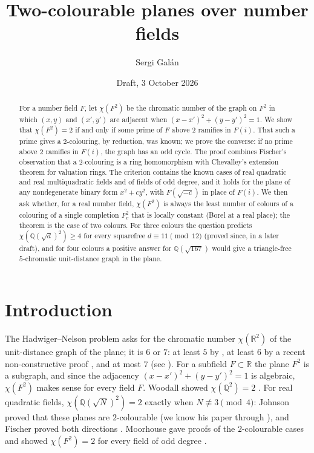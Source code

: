 \documentclass[11pt,a4paper]{amsart}
\title{Two-colourable planes over number fields}
\author{Sergi Gal\'an}
\date{Draft, 3 October 2026}
\theoremstyle{definition}
\newcommand{\Q}{\mathbb{Q}}
\newcommand{\R}{\mathbb{R}}
\begin{document}
\begin{abstract}
For a number field $F$, let $\chi(F^2)$ be the chromatic number of the graph on $F^2$ in which $(x,y)$ and
$(x',y')$ are adjacent when $(x-x')^2+(y-y')^2=1$. We show that $\chi(F^2)=2$ if and only if some prime of $F$
above $2$ ramifies in $F(i)$. That such a prime gives a $2$-colouring, by reduction, was known; we prove the
converse: if no prime above $2$ ramifies in $F(i)$, the graph has an odd cycle. The proof combines Fischer's
observation that a $2$-colouring is a ring homomorphism with Chevalley's extension theorem for valuation rings.
The criterion contains the known cases of real quadratic and real multiquadratic fields and of fields of odd
degree, and it holds for the plane of any nondegenerate binary form $x^2+cy^2$, with $F(\sqrt{-c})$ in place of
$F(i)$. We then ask whether, for a real number field, $\chi(F^2)$ is always the least number of colours of a
colouring of a single completion $F_v^2$ that is locally constant (Borel at a real place); the theorem is the case
of two colours. For three colours the question
predicts $\chi(\Q(\sqrt d)^2)\ge4$ for every squarefree $d\equiv11\pmod{12}$ (proved since, in a later draft), and
for four colours a positive
answer for $\Q(\sqrt{167})$ would give a triangle-free $5$-chromatic unit-distance graph in the plane.
\end{abstract}

\maketitle

\section{Introduction}

The Hadwiger--Nelson problem asks for the chromatic number $\chi(\R^2)$ of the unit-distance graph of the plane;
it is $6$ or $7$: at least $5$ by \cite{deGrey,EI}, at least $6$ by a recent non-constructive
proof \cite{OpenAI}, and at most $7$ (see \cite{Soifer}). For a subfield $F\subset\R$ the plane $F^2$ is a subgraph, and
since the adjacency $(x-x')^2+(y-y')^2=1$ is algebraic, $\chi(F^2)$ makes sense for every field $F$. Woodall
showed $\chi(\Q^2)=2$ \cite{Woodall}. For real quadratic fields, $\chi(\Q(\sqrt N)^2)=2$ exactly when
$N\not\equiv3\pmod 4$: Johnson proved that these planes are $2$-colourable \cite{Johnson1987} (we know his paper
through \cite{Fischer1990,Payne}), and Fischer proved both directions \cite[Theorem~8]{Fischer1990}. Moorhouse
gave proofs of the $2$-colourable cases and showed $\chi(F^2)=2$ for every field of odd degree
\cite[Theorem~7.1, Lemma~8.4, Theorem~8.5]{Moorhouse}.
\end{document}
